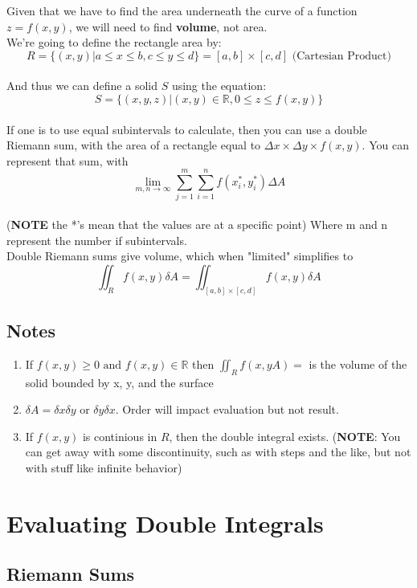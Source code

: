 \documentclass{article}
\begin{document}
Given that we have to find the area underneath the curve of a function $z = f(x,y)$, we will need to find \textbf{volume}, not area.\\
We're going to define the rectangle area by:
$$R = \lbrace (x, y) | a \le x \le b , c \le y \le d \rbrace = [a,b] \times [c, d] \text{ (Cartesian Product)}$$ \\
And thus we can define a solid $S$ using the equation:
$$S = \lbrace  (x, y, z) | (x, y) \in \mathbb{R}, 0 \le z \le f(x, y) \rbrace$$ \\
If one is to use equal subintervals to calculate, then you can use a double Riemann sum, with the area of a rectangle equal to $\Delta x \times \Delta y \times f(x,y)$.
You can represent that sum, with
$$\lim_{m, n \to \infty}\sum_{j=1}^{m} \sum_{i=1}^{n} f(x_i^*, y_i^*)\Delta A$$ \\
(\textbf{NOTE} the *'s mean that the values are at a specific point) Where m and n represent the number if subintervals. \\
Double Riemann sums give volume, which when "limited" simplifies to
$$\iint_{R} f(x, y) \delta A = \iint_{[a, b] \times [c, d]} f(x,y) \delta A$$

\subsection{Notes}


\begin{enumerate}
    \item If $f(x, y) \ge 0 \text{ and } f(x, y) \in \mathbb{R}$ then $\iint_{R} f(x, yA) = $ is the volume of the solid bounded by x, y, and the surface
    \item $\delta A = \delta x \delta y \text{ or } \delta y \delta x$. Order will impact evaluation but not result.
    \item If $f(x, y)$ is continious in  $R$, then the double integral exists. (\textbf{NOTE}: You can get away with some discontinuity, such as with steps and the like, but not with stuff like infinite behavior)
\end{enumerate}


\section{Evaluating Double Integrals}

\subsection{Riemann Sums}
\end{document}
